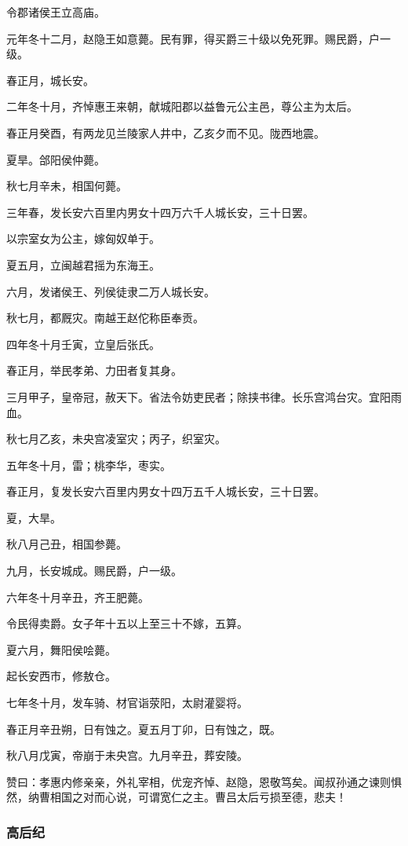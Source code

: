 \documentclass[]{article}
\begin{document}
令郡诸侯王立高庙。

元年冬十二月，赵隐王如意薨。民有罪，得买爵三十级以免死罪。赐民爵，户一级。

春正月，城长安。

二年冬十月，齐悼惠王来朝，献城阳郡以益鲁元公主邑，尊公主为太后。

春正月癸酉，有两龙见兰陵家人井中，乙亥夕而不见。陇西地震。

夏旱。郃阳侯仲薨。

秋七月辛未，相国何薨。

三年春，发长安六百里内男女十四万六千人城长安，三十日罢。

以宗室女为公主，嫁匈奴单于。

夏五月，立闽越君摇为东海王。

六月，发诸侯王、列侯徒隶二万人城长安。

秋七月，都厩灾。南越王赵佗称臣奉贡。

四年冬十月壬寅，立皇后张氏。

春正月，举民孝弟、力田者复其身。

三月甲子，皇帝冠，赦天下。省法令妨吏民者；除挟书律。长乐宫鸿台灾。宜阳雨血。

秋七月乙亥，未央宫凌室灾；丙子，织室灾。

五年冬十月，雷；桃李华，枣实。

春正月，复发长安六百里内男女十四万五千人城长安，三十日罢。

夏，大旱。

秋八月己丑，相国参薨。

九月，长安城成。赐民爵，户一级。

六年冬十月辛丑，齐王肥薨。

令民得卖爵。女子年十五以上至三十不嫁，五算。

夏六月，舞阳侯哙薨。

起长安西市，修敖仓。

七年冬十月，发车骑、材官诣荥阳，太尉灌婴将。

春正月辛丑朔，日有蚀之。夏五月丁卯，日有蚀之，既。

秋八月戊寅，帝崩于未央宫。九月辛丑，葬安陵。

赞曰：孝惠内修亲亲，外礼宰相，优宠齐悼、赵隐，恩敬笃矣。闻叔孙通之谏则惧然，纳曹相国之对而心说，可谓宽仁之主。曹吕太后亏损至德，悲夫！

\hypertarget{header-n187}{%
\subsubsection{高后纪}\label{header-n187}}
\end{document}
